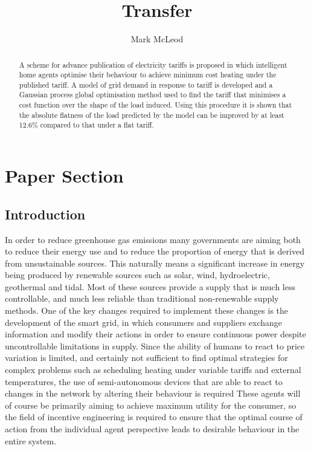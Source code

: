 \documentclass[a4paper, 10 pt, conference]{ieeeconf}  %
\title{\LARGE \bf Transfer}
\author{Mark McLeod}
\date{}
\begin{document}
\maketitle
\thispagestyle{empty}
\pagestyle{empty}

\section{Paper Section}
\begin{abstract}
A scheme for advance publication of electricity tariffs is proposed in which intelligent home agents optimise their behaviour to achieve minimum cost heating under the published tariff. A model of grid demand in response to tariff is developed and a Gaussian process global optimisation method used to find the tariff that minimises a cost function over the shape of the load induced. Using this procedure it is shown that the absolute flatness of the load predicted by the model can be improved by at least 12.6\% compared to that under a flat tariff.
\end{abstract}

\subsection{Introduction}

In order to reduce greenhouse gas emissions many governments are aiming both to reduce their energy use and to reduce the proportion of energy that is derived from unsustainable sources. This naturally means a significant increase in energy being produced by renewable sources such as solar, wind, hydroelectric, geothermal and tidal. Most of these sources provide a supply that is much less controllable, and much less reliable than traditional non-renewable supply methods. One of the key changes required to implement these changes is the development of the smart grid, in which consumers and suppliers exchange information and modify their actions in order to ensure continuous power despite uncontrollable limitations in supply. Since the ability of humans to react to price variation is limited, and certainly not sufficient to find optimal strategies for complex problems such as scheduling heating under variable tariffs and external temperatures, the use of semi-autonomous devices that are able to react to changes in the network by altering their behaviour is required \cite{rogers2012delivering} These agents will of course be primarily aiming to achieve maximum utility for the consumer, so the field of incentive engineering is required to ensure that the optimal course of action from the individual agent perspective leads to desirable behaviour in the entire system.
\end{document}
